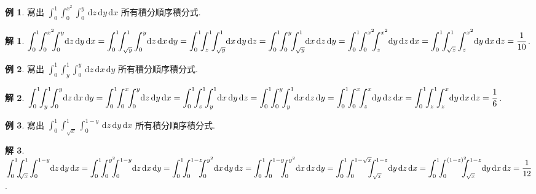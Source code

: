 \documentclass[12pt]{extarticle}
\newcommand{\ds}{\displaystyle}
\theoremstyle{definition}
\newtheorem*{ex}{例}
\newtheorem*{sol}{解}
\begin{document}
{\begin{ex}
  寫出 $\ds\int_0^1\!\!\int_0^{x^2}\!\!\!\int_0^{y}\!\!\,\text{d}z\,\text{d}y\,\text{d}x$ 所有積分順序積分式.
\end{ex}

\begin{sol}
  $\ds\int_0^1\!\!\int_0^{x^2}\!\!\!\int_0^{y}\!\!\,\text{d}z\,\text{d}y\,\text{d}x = \int_0^1\!\!\int_{\sqrt{y}}^1\int_0^{y}\!\!\,\text{d}z\,\text{d}x\,\text{d}y = \int_0^1\!\!\int_z^1\!\!\int_{\sqrt{y}}^1\!\!\,\text{d}x\,\text{d}y\,\text{d}z = \int_0^1\!\!\int_0^y\!\!\int_{\sqrt{y}}^1\!\!\,\text{d}x\,\text{d}z\,\text{d}y = \int_0^1\!\!\int_0^{x^2}\!\!\!\int_z^{x^2}\!\!\,\text{d}y\,\text{d}z\,\text{d}x \\= \int_0^1\!\!\int_{\sqrt{z}}^1\int_z^{x^2}\!\!\,\text{d}y\,\text{d}x\,\text{d}z = \frac{1}{10}$.
\end{sol}

\begin{ex}
  寫出 $\ds\int_0^1\!\!\int_y^{1}\!\!\!\int_0^{y}\!\!\,\text{d}z\,\text{d}x\,\text{d}y$ 所有積分順序積分式.
\end{ex}

\begin{sol}
  $\ds\int_0^1\!\!\int_y^{1}\!\!\int_0^{y}\!\!\,\text{d}z\,\text{d}x\,\text{d}y = \int_0^1\!\!\int_0^{x}\!\!\int_0^{y}\!\!\,\text{d}z\,\text{d}y\,\text{d}x = \int_0^1\!\!\int_z^1\!\!\int_{y}^1\!\!\,\text{d}x\,\text{d}y\,\text{d}z = \int_0^1\!\!\int_0^y\!\!\int_{y}^1\!\!\,\text{d}x\,\text{d}z\,\text{d}y = \int_0^1\!\!\int_0^{x}\!\!\int_z^{x}\!\!\,\text{d}y\,\text{d}z\,\text{d}x \\= \int_0^1\!\!\int_{z}^1\!\!\int_z^{x}\!\!\,\text{d}y\,\text{d}x\,\text{d}z = \frac{1}{6}$.
\end{sol}

\begin{ex}
  寫出 $\ds\int_0^1\!\!\int_{\!\!\sqrt{x}}^{1}\int_0^{1 - y}\!\!\,\text{d}z\,\text{d}y\,\text{d}x$ 所有積分順序積分式.
\end{ex}

\begin{sol}
  $\ds\int_0^1\!\!\int_{\!\!\sqrt{x}}^{1}\int_0^{1 - y}\!\!\,\text{d}z\,\text{d}y\,\text{d}x= \int_0^1\!\!\int_0^{y^2}\!\!\!\!\int_0^{1 - y}\!\!\,\text{d}z\,\text{d}x\,\text{d}y = \int_0^1\!\!\int_0^{1 - z}\!\!\!\!\int_{0}^{y^2}\!\!\,\text{d}x\,\text{d}y\,\text{d}z = \int_0^1\!\!\int_0^{1 - y}\!\!\!\!\int_{0}^{y^2}\!\!\,\text{d}x\,\text{d}z\,\text{d}y \\= \int_0^1\!\!\int_0^{1 - \sqrt{x}}\!\!\!\!\int_{\sqrt{x}}^{1 - z}\!\!\,\text{d}y\,\text{d}z\,\text{d}x = \int_0^1\!\!\int_{0}^{(1 - z)^2}\!\!\!\!\!\int_{\sqrt{x}}^{1 - z}\!\!\,\text{d}y\,\text{d}x\,\text{d}z = \frac{1}{12}$.
\end{sol}

}
\end{document}
